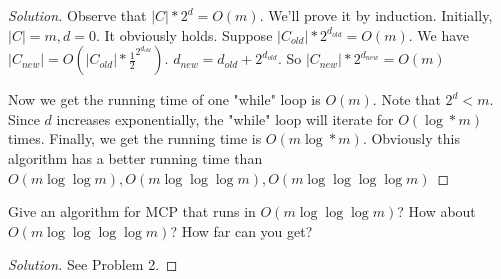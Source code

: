 \begin{proof}[Solution]
        Observe that $|C|*2^{d}=O(m)$.
        We'll prove it by induction.
        Initially, $|C|=m,d=0$.
        It obviously holds.
        Suppose $|C_{old}|*2^{d_{old}}=O(m)$.
        We have$|C_{new}|=O(|C_{old}|*\frac{1}{2}^{2^{d_{old}}})$.
        $d_{new}=d_{old}+2^{d_{old}}$.
        So  $|C_{new}|*2^{d_{new}}=O(m)$

        Now we get the running time of one "while" loop is $O(m)$.
        Note that $2^{d}<m$.
        Since $d$ increases exponentially, the "while" loop will iterate for $O(\log*m)$ times.
        Finally, we get the running time is $O(m\log*m)$.
        Obviously this algorithm has a better running time than $O(m\log\log m),O(m\log\log\log m),O(m\log\log\log\log m)$
    \end{proof}
    \begin{thm}{}{}
        Give an algorithm for MCP that runs in $O(m\log\log\log m)$? How about $O(m\log\log\log\log m)$?
        How far can you get?
    \end{thm}
    \begin{proof}[Solution]
        See Problem 2.
    \end{proof}

